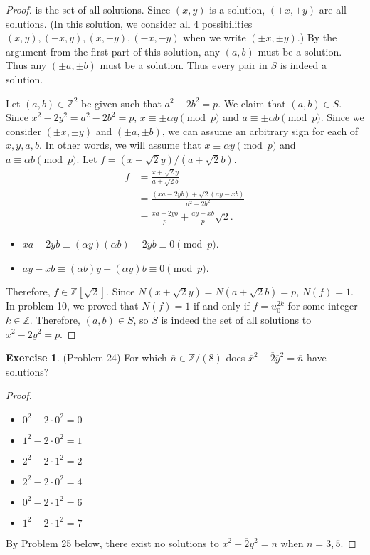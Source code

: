 \documentclass[12pt, psamsfonts]{amsart}
\theoremstyle{definition}
\newtheorem*{exer}{Exercise}
\theoremstyle{remark}
\numberwithin{equation}{section}
\begin{document}
\begin{proof}
  is the set of all solutions.
  Since $(x, y)$ is a solution, $(\pm x, \pm y)$ are all solutions.
  (In this solution, we consider all 4 possibilities $(x, y), (-x, y), (x, -y), (-x, -y)$ when we write $(\pm x, \pm y)$.)
  By the argument from the first part of this solution, any $(a, b)$ must be a solution.
  Thus any $(\pm a, \pm b)$ must be a solution.
  Thus every pair in $S$ is indeed a solution.

  Let $(a, b) \in \mathbb{Z}^2$ be given such that $a^2 - 2b^2 = p$.
  We claim that $(a, b) \in S$.
  Since $x^2 - 2y^2 = a^2 - 2b^2 = p$, $x \equiv \pm \alpha y \pmod p$ and $a \equiv \pm \alpha b \pmod p$.
  Since we consider $(\pm x, \pm y)$ and $(\pm a, \pm b)$, we can assume an arbitrary sign for each of $x, y, a, b$.
  In other words, we will assume that $x \equiv \alpha y \pmod p$ and $a \equiv \alpha b \pmod p$.
  Let $f = (x + \sqrt{2}y) / (a + \sqrt{2}b)$.
  \begin{align*}
    f &= \frac{x + \sqrt{2}y}{a + \sqrt{2}b} \\
      &= \frac{(xa - 2yb) + \sqrt{2}(ay - xb)}{a^2 - 2b^2} \\
      &= \frac{xa - 2yb}{p} + \frac{ay - xb}{p}\sqrt{2}.
  \end{align*}
  \begin{itemize}
    \item
      $xa - 2yb \equiv (\alpha y)(\alpha b) - 2yb \equiv 0 \pmod p$.
    \item
      $ay - xb \equiv (\alpha b)y - (\alpha y)b \equiv 0 \pmod p$.
  \end{itemize}
  Therefore, $f \in \mathbb{Z}[\sqrt{2}]$.
  Since $N(x + \sqrt{2}y) = N(a + \sqrt{2}b) = p$, $N(f) = 1$.
  In problem 10, we proved that $N(f) = 1$ if and only if $f = u_0^{2k}$ for some integer $k \in \mathbb{Z}$.
  Therefore, $(a, b) \in S$, so $S$ is indeed the set of all solutions to $x^2 - 2y^2 = p$.
\end{proof}

\begin{exer}{(Problem 24)}
  For which $\overline{n} \in \mathbb{Z}/(8)$ does $\overline{x}^2 - \overline{2}\overline{y}^2 = \overline{n}$ have solutions?
\end{exer}

\begin{proof}
  $ $
  \begin{itemize}
    \item $0^2 - 2 \cdot 0^2 = 0$
    \item $1^2 - 2 \cdot 0^2 = 1$
    \item $2^2 - 2 \cdot 1^2 = 2$
    \item $2^2 - 2 \cdot 0^2 = 4$
    \item $0^2 - 2 \cdot 1^2 = 6$
    \item $1^2 - 2 \cdot 1^2 = 7$
  \end{itemize}
  By Problem 25 below, there exist no solutions to $\overline{x}^2 - \overline{2}\overline{y}^2 = \overline{n}$ when $\overline{n} = 3, 5$.

\end{proof}
\end{document}

